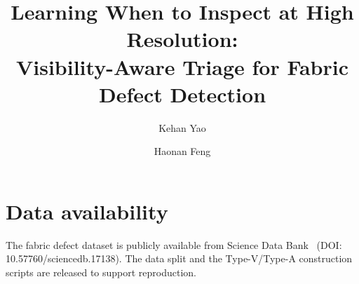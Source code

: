 \documentclass[preprint,11pt]{elsarticle}
\begin{document}
\begin{frontmatter}
\title{Learning When to Inspect at High Resolution:\\
Visibility-Aware Triage for Fabric Defect Detection}
\author[a]{Kehan Yao}
\author[b]{Haonan Feng}
\address[a]{China Telecom Group Hangzhou Branch, Hangzhou, China}
\address[b]{The Third Research Institute of the Ministry of Public Security, Shanghai, China}

\end{frontmatter}









\section*{Data availability}
The fabric defect dataset is publicly available from Science Data Bank~\cite{scidb_fabric}
(DOI: 10.57760/sciencedb.17138). The data split and the
Type-V/Type-A construction scripts are released to support reproduction.



\end{document}
